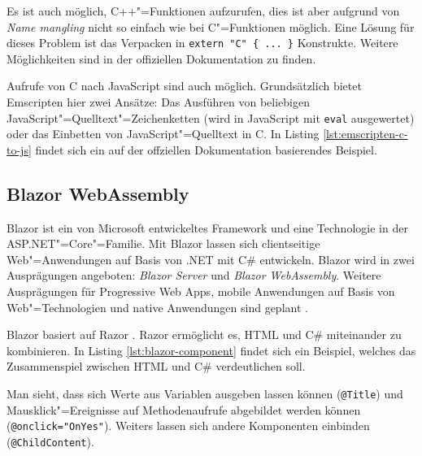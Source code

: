 

Es ist auch möglich, C++"=Funktionen aufzurufen, dies ist aber aufgrund von \emph{Name mangling} nicht so einfach wie bei C"=Funktionen möglich. Eine Lösung für dieses Problem ist das Verpacken in \lstinline|extern "C" { ... }| Konstrukte. Weitere Möglichkeiten sind in der offiziellen Dokumentation zu finden.

Aufrufe von C nach JavaScript sind auch möglich. Grundsätzlich bietet Emscripten hier zwei Ansätze: Das Ausführen von beliebigen JavaScript"=Quelltext"=Zeichenketten (wird in JavaScript mit \lstinline{eval} ausgewertet) oder das Einbetten von JavaScript"=Quelltext in C. In Listing \ref{lst:emscripten-c-to-js} findet sich ein auf der offziellen Dokumentation basierendes Beispiel.



\subsection{Blazor WebAssembly}
Blazor \cite{Blazor} ist ein von Microsoft entwickeltes Framework und eine Technologie in der ASP.NET"=Core"=Familie. Mit Blazor lassen sich clientseitige Web"=Anwendungen auf Basis von .NET mit C\#{} entwickeln. Blazor wird in zwei Ausprägungen angeboten: \emph{Blazor Server} und \emph{Blazor WebAssembly}. Weitere Ausprägungen für Progressive Web Apps, mobile Anwendungen auf Basis von Web"=Technologien und native Anwendungen sind geplant \cite{BlazorBlog}.

Blazor basiert auf Razor \cite{Razor}. Razor ermöglicht es, HTML und C\#{} miteinander zu kombinieren. In Listing \ref{lst:blazor-component} findet sich ein Beispiel, welches das Zusammenspiel zwischen HTML und C\#{} verdeutlichen soll.

\pagebreak


Man sieht, dass sich Werte aus Variablen ausgeben lassen können (\lstinline{@Title}) und Mausklick"=Ereignisse auf Methodenaufrufe abgebildet werden können (\lstinline{@onclick="OnYes"}). Weiters lassen sich andere Komponenten einbinden (\lstinline{@ChildContent}).

